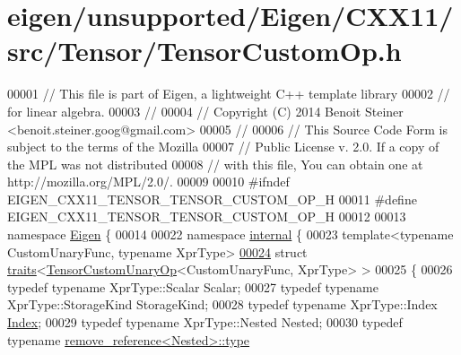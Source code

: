\hypertarget{eigen_2unsupported_2_eigen_2_c_x_x11_2src_2_tensor_2_tensor_custom_op_8h_source}{}\section{eigen/unsupported/\+Eigen/\+C\+X\+X11/src/\+Tensor/\+Tensor\+Custom\+Op.h}
\label{eigen_2unsupported_2_eigen_2_c_x_x11_2src_2_tensor_2_tensor_custom_op_8h_source}

\begin{DoxyCode}
00001 \textcolor{comment}{// This file is part of Eigen, a lightweight C++ template library}
00002 \textcolor{comment}{// for linear algebra.}
00003 \textcolor{comment}{//}
00004 \textcolor{comment}{// Copyright (C) 2014 Benoit Steiner <benoit.steiner.goog@gmail.com>}
00005 \textcolor{comment}{//}
00006 \textcolor{comment}{// This Source Code Form is subject to the terms of the Mozilla}
00007 \textcolor{comment}{// Public License v. 2.0. If a copy of the MPL was not distributed}
00008 \textcolor{comment}{// with this file, You can obtain one at http://mozilla.org/MPL/2.0/.}
00009 
00010 \textcolor{preprocessor}{#ifndef EIGEN\_CXX11\_TENSOR\_TENSOR\_CUSTOM\_OP\_H}
00011 \textcolor{preprocessor}{#define EIGEN\_CXX11\_TENSOR\_TENSOR\_CUSTOM\_OP\_H}
00012 
00013 \textcolor{keyword}{namespace }\hyperlink{namespace_eigen}{Eigen} \{
00014 
00022 \textcolor{keyword}{namespace }\hyperlink{namespaceinternal}{internal} \{
00023 \textcolor{keyword}{template}<\textcolor{keyword}{typename} CustomUnaryFunc, \textcolor{keyword}{typename} XprType>
\hyperlink{struct_eigen_1_1internal_1_1traits_3_01_tensor_custom_unary_op_3_01_custom_unary_func_00_01_xpr_type_01_4_01_4}{00024} \textcolor{keyword}{struct }\hyperlink{struct_eigen_1_1internal_1_1traits}{traits}<\hyperlink{class_eigen_1_1_tensor_custom_unary_op}{TensorCustomUnaryOp}<CustomUnaryFunc, XprType> >
00025 \{
00026   \textcolor{keyword}{typedef} \textcolor{keyword}{typename} XprType::Scalar Scalar;
00027   \textcolor{keyword}{typedef} \textcolor{keyword}{typename} XprType::StorageKind StorageKind;
00028   \textcolor{keyword}{typedef} \textcolor{keyword}{typename} XprType::Index \hyperlink{namespace_eigen_a62e77e0933482dafde8fe197d9a2cfde}{Index};
00029   \textcolor{keyword}{typedef} \textcolor{keyword}{typename} XprType::Nested Nested;
00030   \textcolor{keyword}{typedef} \textcolor{keyword}{typename} \hyperlink{group___sparse_core___module}{remove\_reference<Nested>::type} 

\end{DoxyCode}
